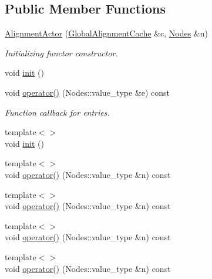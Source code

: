 \subsection*{Public Member Functions}
\begin{DoxyCompactItemize}
\item 
\hyperlink{class_d_d4hep_1_1_alignments_1_1_alignment_actor_a4442541ec4416c08e7a36c7b5eaacbfb}{AlignmentActor} (\hyperlink{class_d_d4hep_1_1_alignments_1_1_global_alignment_cache}{GlobalAlignmentCache} \&c, \hyperlink{class_d_d4hep_1_1_alignments_1_1_alignment_operator_a2f25eae1d38abc30a09f7a840ab0662a}{Nodes} \&n)
\begin{DoxyCompactList}\small\item\em Initializing functor constructor. \item\end{DoxyCompactList}\item 
void \hyperlink{class_d_d4hep_1_1_alignments_1_1_alignment_actor_a594062a18b6bedd5dfb66abd663bf42e}{init} ()
\item 
void \hyperlink{class_d_d4hep_1_1_alignments_1_1_alignment_actor_a5de694318f060574c5c2ec4d5f3ee8f1}{operator()} (Nodes::value\_\-type \&e) const 
\begin{DoxyCompactList}\small\item\em Function callback for entries. \item\end{DoxyCompactList}\item 
{\footnotesize template$<$$>$ }\\void \hyperlink{class_d_d4hep_1_1_alignments_1_1_alignment_actor_aed1000b7bcf5cf2248311fff6ccc89f6}{init} ()
\item 
{\footnotesize template$<$$>$ }\\void \hyperlink{class_d_d4hep_1_1_alignments_1_1_alignment_actor_a0cb93f75530d12e2c9ed594a3858bb0a}{operator()} (Nodes::value\_\-type \&n) const
\item 
{\footnotesize template$<$$>$ }\\void \hyperlink{class_d_d4hep_1_1_alignments_1_1_alignment_actor_a35e891dcac2dff5df02eb6d47aa00104}{operator()} (Nodes::value\_\-type \&n) const
\item 
{\footnotesize template$<$$>$ }\\void \hyperlink{class_d_d4hep_1_1_alignments_1_1_alignment_actor_aa389c5c1df5d09c2a21d74b1b28aca26}{operator()} (Nodes::value\_\-type \&n) const
\item 
{\footnotesize template$<$$>$ }\\void \hyperlink{class_d_d4hep_1_1_alignments_1_1_alignment_actor_ad7e40f4e0ba2257f3492f5dba458682b}{operator()} (Nodes::value\_\-type \&n) const
\end{DoxyCompactItemize}



